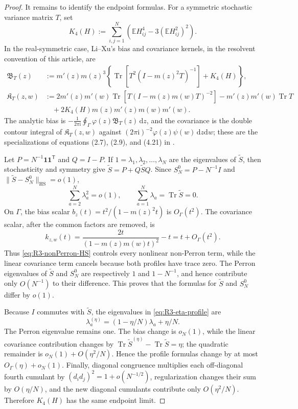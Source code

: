 \documentclass[11pt]{article}
\theoremstyle{definition}
\theoremstyle{remark}
\newcommand{\E}{\mathbb E}
\newcommand{\Tr}{\operatorname{Tr}}
\newcommand{\ii}{\mathrm i}
\newcommand{\dd}{\mathrm d}
\newcommand{\HS}{\mathrm{HS}}
\newcommand{\one}{\mathbf 1}
\newcommand{\norm}[1]{\lVert #1\rVert}
\begin{document}
\begin{proof}
It remains to identify the endpoint formulas.  For a symmetric stochastic
variance matrix \(T\), set
\begin{equation}\label{eq:R3-LiXu-k4}
 K_4(H):=\sum_{i,j=1}^N
 \left(\E H_{ij}^4-3(\E H_{ij}^2)^2\right).
\end{equation}
In the real-symmetric case, Li--Xu's bias and covariance kernels, in the
resolvent convention of this article, are
\begin{align}
 \mathfrak B_T(z)
 &:=m'(z)m(z)^3
 \left\{\Tr\!\left[T^2(I-m(z)^2T)^{-1}\right]+K_4(H)\right\},
 \label{eq:R3-LiXu-bias-kernel}\\
 \mathfrak K_T(z,w)
 &:=2m'(z)m'(w)
 \Tr\!\left[T(I-m(z)m(w)T)^{-2}\right]
 -m'(z)m'(w)\Tr T\nonumber\\
 &\quad+2K_4(H)m(z)m'(z)m(w)m'(w).
 \label{eq:R3-LiXu-cov-kernel}
\end{align}
The analytic bias is
\(-\frac1{2\pi\ii}\oint_\Gamma\varphi(z)\mathfrak B_T(z)\,\dd z\),
and the covariance is the double contour integral of
\(\mathfrak K_T(z,w)\) against
\((2\pi\ii)^{-2}\varphi(z)\psi(w)\,\dd z\dd w\); these are the
specializations of equations (2.7), (2.9), and (4.21) in
\cite{LiXu2021GeneralizedWignerLES}.

Let \(P=N^{-1}\one\one^{\mathsf T}\) and \(Q=I-P\).  If
\(1=\lambda_1,\lambda_2,\ldots,\lambda_N\) are the eigenvalues of
\(\widetilde S\), then stochasticity and symmetry give
\(\widetilde S=P+Q\widetilde S Q\).  Since
\(S_N^0=P-N^{-1}I\) and
\(\norm{\widetilde S-S_N^0}_{\HS}=o(1)\),
\begin{equation}\label{eq:R3-nonPerron-HS}
 \sum_{a=2}^N\lambda_a^2=o(1),
 \qquad \sum_{a=1}^N\lambda_a=\Tr\widetilde S=0.
\end{equation}
On \(\Gamma\), the bias scalar
\(b_z(t)=t^2/(1-m(z)^2t)\) is \(O_\Gamma(t^2)\).  The covariance scalar,
after the common factors are removed, is
\[
 k_{z,w}(t)=\frac{2t}{(1-m(z)m(w)t)^2}-t
 =t+O_\Gamma(t^2).
\]
Thus \eqref{eq:R3-nonPerron-HS} controls every nonlinear non-Perron term,
while the linear covariance term cancels because both profiles have trace
zero.  The Perron eigenvalues of \(\widetilde S\) and \(S_N^0\) are
respectively \(1\) and \(1-N^{-1}\), and hence contribute only \(O(N^{-1})\)
to their difference.  This proves that the formulas for \(\widetilde S\)
and \(S_N^0\) differ by \(o(1)\).

Because \(I\) commutes with \(\widetilde S\), the eigenvalues in
\eqref{eq:R3-eta-profile} are
\[
 \lambda_a^{(\eta)}=(1-\eta/N)\lambda_a+\eta/N.
\]
The Perron eigenvalue remains one.  The bias change is \(o_N(1)\), while the
linear covariance contribution changes by
\(\Tr\widetilde S^{(\eta)}-\Tr\widetilde S=\eta\); the quadratic remainder
is \(o_N(1)+O(\eta^2/N)\).  Hence the profile formulas change by at most
\(O_\Gamma(\eta)+o_N(1)\).  Finally, diagonal congruence multiplies each
off-diagonal fourth cumulant by \((d_id_j)^2=1+o(N^{-1/2})\), regularization
changes their sum by \(O(\eta/N)\), and the new diagonal cumulants contribute
only \(O(\eta^2/N)\).  Therefore \(K_4(H)\) has the same endpoint limit.


\end{proof}
\end{document}

